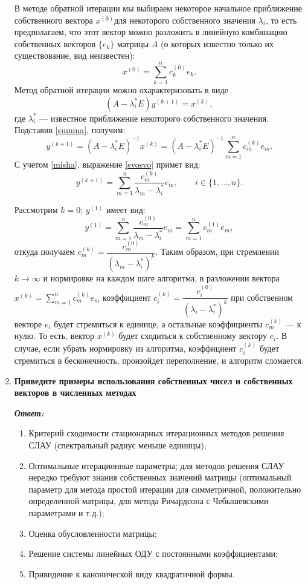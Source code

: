\documentclass[12pt, a4paper]{article}
\begin{document}
\begin{enumerate}
	В методе обратной итерации мы выбираем некоторое начальное приближение собственного вектора $x^{(0)}$для некоторого собственного значения $\lambda_i$, то есть предполагаем, что этот вектор можно разложить в линейную комбинацию собственных векторов $\{ e_k \}$ матрицы $A$ (о которых известно только их существование, вид неизвестен):
	\begin{equation}
		\label{summa}
		x^{(0)} = \sum_{k=1}^{n} c_k^{(0)} e_k.
	\end{equation}
	Метод обратной итерации можно охарактеризовать в виде
	$$
	\left( A - \lambda^*_i E \right ) y^{(k+1)} = x^{(k)},
	$$
	где $\lambda^*_i$ --- известное приближение некоторого собственного значения. Подставив \eqref{summa}, получим:
	\begin{equation}
		\label{svosvo}
		y^{(k+1)} = \left( A - \lambda^*_i E \right )^{-1} x^{(k)} = \left( A - \lambda^*_i E \right )^{-1} \sum_{m=1}^{n} c_m^{(k)} e_m.
	\end{equation}
	С учетом \eqref{misha}, выражение \eqref{svosvo} примет вид:
	$$
	y^{(k+1)} = \sum_{m=1}^{n} \frac{ c_m^{(k)} }{\lambda_m - \lambda^*_i} e_m, \qquad i \in \{1, \dots, n \}.
	$$
	
	Рассмотрим $k = 0$; $y^{(1)}$ имеет вид:
	$$
	y^{(1)} = \sum_{m=1}^{n} \frac{ c_m^{(0)} }{\lambda_m - \lambda^*_i} e_m = \sum_{m=1}^{n} c_m^{(1)}  e_m,
	$$
	откуда получаем $c^{(k)}_m = \dfrac{c^{(0)}_m}{(\lambda_m - \lambda^*_i)^k}$. Таким образом, при стремлении $k \to \infty$ и нормировке на каждом шаге алгоритма, в разложении вектора $x^{(k)} = \sum_{m=1}^{n} c_m^{(k)}  e_m$ коэффициент $c_i^{(k)} = \dfrac{ c_i^{(0)} }{(\lambda_i - \lambda^*_i)^k}$ при собственном векторе $e_i$ будет стремиться к единице, а остальные коэффициенты $c_m^{(k)}$ --- к нулю. То есть, вектор $x^{(k)}$ будет сходиться к собственному вектору $e_i$. В случае, если убрать нормировку из алгоритма, коэффициент $c_i^{(k)}$ будет стремиться в бесконечность, произойдет переполнение, и алгоритм сломается.
	
	
	\item \textbf{Приведите примеры использования собственных чисел и собственных векторов в численных методах}
	\vspace*{0.2cm}
	
	\textit{\textbf{Ответ:}}
	\begin{enumerate}
		\item Критерий сходимости стационарных итерационных методов решения СЛАУ (спектральный радиус меньше единицы); 
		\item Оптимальные итерационные параметры; для методов решения СЛАУ нередко требуют знания собственных значений матрицы (оптимальный параметр для метода простой итерации для симметричной, положительно определенной матрицы, для метода Ричардсона с Чебышевскими параметрами и т.д.);
		\item Оценка обусловленности матрицы;
		\item Решение системы линейных ОДУ с постоянными коэффициентами; 
		\item Привидение к канонической виду квадратичной формы. 
	\end{enumerate}
	
	\end{enumerate}
	
\end{document}
